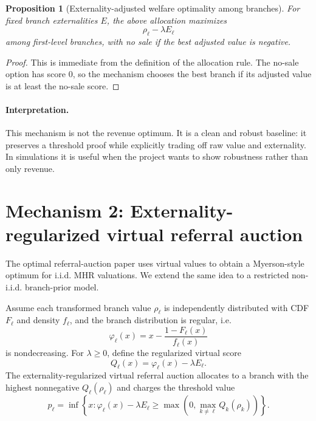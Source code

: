 \documentclass[11pt]{article}
\newtheorem{proposition}{Proposition}
\begin{document}
\begin{proposition}[Externality-adjusted welfare optimality among branches]
For fixed branch externalities $E$, the above allocation maximizes
\[
    \rho_\ell-\lambda E_\ell
\]
among first-level branches, with no sale if the best adjusted value is negative.
\end{proposition}
\begin{proof}
This is immediate from the definition of the allocation rule. The no-sale option has score $0$, so the mechanism chooses the best branch if its adjusted value is at least the no-sale score.
\end{proof}

\paragraph{Interpretation.} This mechanism is not the revenue optimum. It is a clean and robust baseline: it preserves a threshold proof while explicitly trading off raw value and externality. In simulations it is useful when the project wants to show robustness rather than only revenue.

\section{Mechanism 2: Externality-regularized virtual referral auction}

The optimal referral-auction paper uses virtual values to obtain a Myerson-style optimum for i.i.d. MHR valuations. We extend the same idea to a restricted non-i.i.d. branch-prior model.

Assume each transformed branch value $\rho_\ell$ is independently distributed with CDF $F_\ell$ and density $f_\ell$, and the branch distribution is regular, i.e.
\[
    \varphi_\ell(x)=x-\frac{1-F_\ell(x)}{f_\ell(x)}
\]
is nondecreasing. For $\lambda\ge 0$, define the regularized virtual score
\[
    Q_\ell(x)=\varphi_\ell(x)-\lambda E_\ell.
\]
The externality-regularized virtual referral auction allocates to a branch with the highest nonnegative $Q_\ell(\rho_\ell)$ and charges the threshold value
\[
    p_\ell = \inf\left\{x: \varphi_\ell(x)-\lambda E_\ell\ge \max\left(0,\max_{k\ne \ell}Q_k(\rho_k)\right)\right\}.
\]
\end{document}
